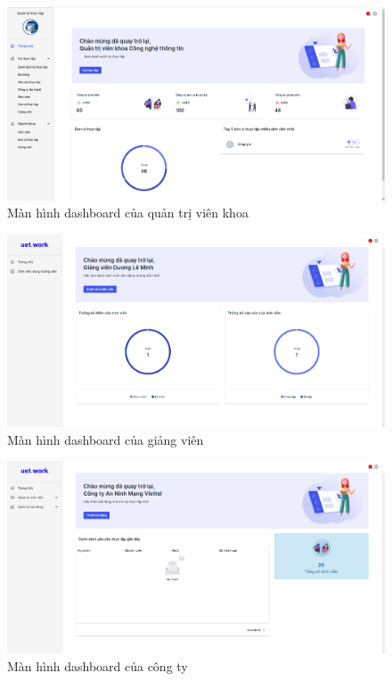 \documentclass[./../main.tex]{subfiles}
\begin{document}
\begin{figure}[H]
	\includegraphics[width=\linewidth]{./images/image82.png}
	\caption{Màn hình dashboard của quản trị viên khoa}
	\label{fig:org_dashboard}
\end{figure}

\begin{figure}[H]
	\includegraphics[width=\linewidth]{./images/image85.png}
	\caption{Màn hình dashboard của giảng viên}
	\label{fig:lecturer_dashboard}
\end{figure}

\begin{figure}[H]
	\includegraphics[width=\linewidth]{./images/image84.png}
	\caption{Màn hình dashboard của công ty}
	\label{fig:partner_dashboard}
\end{figure}
\end{document}
